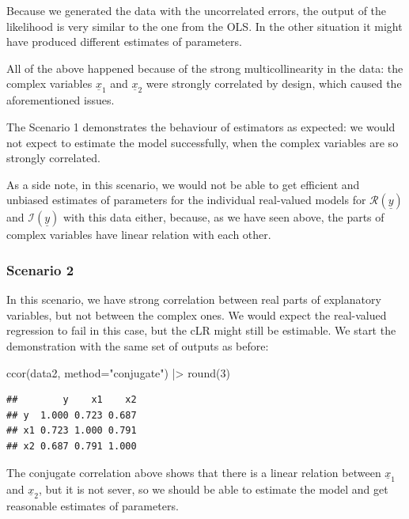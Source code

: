 \documentclass[
]{book}
\newenvironment{Shaded}{\begin{snugshade}}{\end{snugshade}}
\newcommand{\AttributeTok}[1]{\textcolor[rgb]{0.77,0.63,0.00}{#1}}
\newcommand{\DecValTok}[1]{\textcolor[rgb]{0.00,0.00,0.81}{#1}}
\newcommand{\FunctionTok}[1]{\textcolor[rgb]{0.00,0.00,0.00}{#1}}
\newcommand{\NormalTok}[1]{#1}
\newcommand{\SpecialCharTok}[1]{\textcolor[rgb]{0.00,0.00,0.00}{#1}}
\newcommand{\StringTok}[1]{\textcolor[rgb]{0.31,0.60,0.02}{#1}}
\begin{document}
Because we generated the data with the uncorrelated errors, the output of the likelihood is very similar to the one from the OLS. In the other situation it might have produced different estimates of parameters.

All of the above happened because of the strong multicollinearity in the data: the complex variables \(\underline{x}_{1}\) and \(\underline{x}_{2}\) were strongly correlated by design, which caused the aforementioned issues.

The Scenario 1 demonstrates the behaviour of estimators as expected: we would not expect to estimate the model successfully, when the complex variables are so strongly correlated.

As a side note, in this scenario, we would not be able to get efficient and unbiased estimates of parameters for the individual real-valued models for \(\mathcal{R}\left(\underline{y}\right)\) and \(\mathcal{I}\left(\underline{y}\right)\) with this data either, because, as we have seen above, the parts of complex variables have linear relation with each other.

\hypertarget{scenario-2}{%
\subsubsection*{Scenario 2}\label{scenario-2}}

In this scenario, we have strong correlation between real parts of explanatory variables, but not between the complex ones. We would expect the real-valued regression to fail in this case, but the cLR might still be estimable. We start the demonstration with the same set of outputs as before:

\begin{Shaded}
\begin{Highlighting}[]
\FunctionTok{ccor}\NormalTok{(data2, }\AttributeTok{method=}\StringTok{"conjugate"}\NormalTok{) }\SpecialCharTok{|\textgreater{}} \FunctionTok{round}\NormalTok{(}\DecValTok{3}\NormalTok{)}
\end{Highlighting}
\end{Shaded}

\begin{verbatim}
##        y    x1    x2
## y  1.000 0.723 0.687
## x1 0.723 1.000 0.791
## x2 0.687 0.791 1.000
\end{verbatim}

The conjugate correlation above shows that there is a linear relation between \(\underline{x}_{1}\) and \(\underline{x}_{2}\), but it is not sever, so we should be able to estimate the model and get reasonable estimates of parameters.
\end{document}
